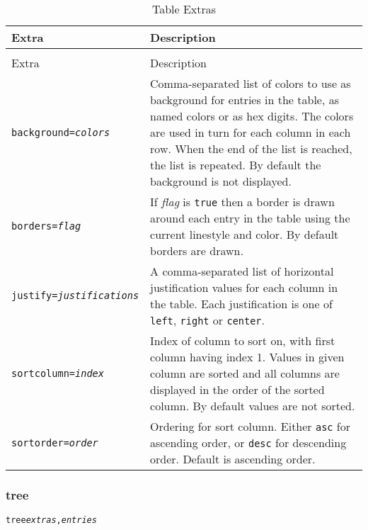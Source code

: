 \begin{longtable}{|l|p{7cm}|}
\hline
\label{tableextras}
Extra & Description \\
\hline
\hline
\endfirsthead
\hline
\caption{Table Extras} \\
\endfoot

\hline
Extra & Description \\
\hline
\hline
\endhead

\texttt{background=\textit{colors}} &

Comma-separated list of colors to use as background for entries
in the table, as named colors or as hex digits.
The colors are used in turn for each column in each row.
When the end of the list is reached, the list is repeated.
By default the background is not displayed. \\

\texttt{borders=\textit{flag}} &

If \textit{flag} is \texttt{true} then a border is drawn around
each entry in the table using the current linestyle and color.
By default borders are drawn. \\

\texttt{justify=\textit{justifications}} &

A comma-separated list of horizontal justification values for each column
in the table.  Each justification is one of
\texttt{left}, \texttt{right} or \texttt{center}. \\

\texttt{sortcolumn=\textit{index}} &

Index of column to sort on, with first column having index 1.
Values in given column are sorted and all columns are displayed
in the order of the sorted column.
By default values are not sorted. \\

\texttt{sortorder=\textit{order}} &

Ordering for sort column.  Either \texttt{asc} for ascending
order, or \texttt{desc} for descending order.  Default is ascending order. \\

\hline
\end{longtable}


\subsubsection{tree}

\begin{alltt}
tree \textit{extras}, \textit{entries}
\end{alltt}

